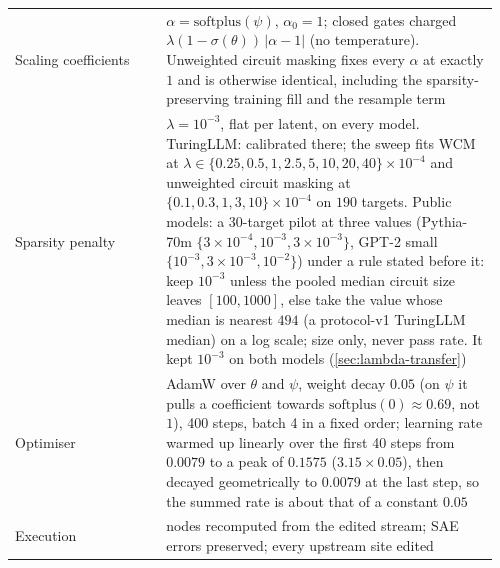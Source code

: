 \documentclass[10pt]{article}
\begin{document}
{\begin{longtable}{@{}p{0.30\linewidth}p{0.66\linewidth}@{}}
Scaling coefficients & $\alpha = \mathrm{softplus}(\psi)$, $\alpha_0 = 1$; closed gates charged $\lambda (1 - \sigma(\theta))\,|\alpha - 1|$ (no temperature). Unweighted circuit masking fixes every $\alpha$ at exactly $1$ and is otherwise identical, including the sparsity-preserving training fill and the resample term \\
Sparsity penalty & $\lambda = 10^{-3}$, flat per latent, on every model. TuringLLM: calibrated there; the sweep fits WCM at $\lambda \in \{0.25, 0.5, 1, 2.5, 5, 10, 20, 40\} \times 10^{-4}$ and unweighted circuit masking at $\{0.1, 0.3, 1, 3, 10\} \times 10^{-4}$ on $190$ targets. Public models: a 30-target pilot at three values (Pythia-70m $\{3 \times 10^{-4}, 10^{-3}, 3 \times 10^{-3}\}$, GPT-2 small $\{10^{-3}, 3 \times 10^{-3}, 10^{-2}\}$) under a rule stated before it: keep $10^{-3}$ unless the pooled median circuit size leaves $[100, 1000]$, else take the value whose median is nearest $494$ (a protocol-v1 TuringLLM median) on a log scale; size only, never pass rate. It kept $10^{-3}$ on both models (\cref{sec:lambda-transfer}) \\
Optimiser & AdamW over $\theta$ and $\psi$, weight decay $0.05$ (on $\psi$ it pulls a coefficient towards $\mathrm{softplus}(0) \approx 0.69$, not $1$), 400 steps, batch 4 in a fixed order; learning rate warmed up linearly over the first 40 steps from $0.0079$ to a peak of $0.1575$ ($3.15 \times 0.05$), then decayed geometrically to $0.0079$ at the last step, so the summed rate is about that of a constant $0.05$ \\
Execution & nodes recomputed from the edited stream; SAE errors preserved; every upstream site edited \\

\end{longtable}}
\end{document}
